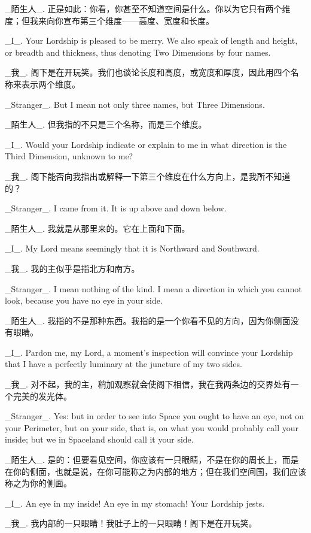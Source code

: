 \documentclass[12pt,UTF8]{ctexbook}
\begin{document}
\_陌生人\_. 正是如此：你看，你甚至不知道空间是什么。你以为它只有两个维度；但我来向你宣布第三个维度——高度、宽度和长度。

\_I\_. Your Lordship is pleased to be merry. We also speak of length and height, or breadth and thickness, thus denoting Two Dimensions by four names.

\_我\_. 阁下是在开玩笑。我们也谈论长度和高度，或宽度和厚度，因此用四个名称来表示两个维度。

\_Stranger\_. But I mean not only three names, but Three Dimensions.

\_陌生人\_. 但我指的不只是三个名称，而是三个维度。

\_I\_. Would your Lordship indicate or explain to me in what direction is the Third Dimension, unknown to me?

\_我\_. 阁下能否向我指出或解释一下第三个维度在什么方向上，是我所不知道的？

\_Stranger\_. I came from it. It is up above and down below.

\_陌生人\_. 我就是从那里来的。它在上面和下面。

\_I\_. My Lord means seemingly that it is Northward and Southward.

\_我\_. 我的主似乎是指北方和南方。

\_Stranger\_. I mean nothing of the kind. I mean a direction in which you cannot look, because you have no eye in your side.

\_陌生人\_. 我指的不是那种东西。我指的是一个你看不见的方向，因为你侧面没有眼睛。

\_I\_. Pardon me, my Lord, a moment's inspection will convince your Lordship that I have a perfectly luminary at the juncture of my two sides.

\_我\_. 对不起，我的主，稍加观察就会使阁下相信，我在我两条边的交界处有一个完美的发光体。

\_Stranger\_. Yes: but in order to see into Space you ought to have an eye, not on your Perimeter, but on your side, that is, on what you would probably call your inside; but we in Spaceland should call it your side.

\_陌生人\_. 是的：但要看见空间，你应该有一只眼睛，不是在你的周长上，而是在你的侧面，也就是说，在你可能称之为内部的地方；但在我们空间国，我们应该称之为你的侧面。

\_I\_. An eye in my inside! An eye in my stomach! Your Lordship jests.

\_我\_. 我内部的一只眼睛！我肚子上的一只眼睛！阁下是在开玩笑。
\end{document}

